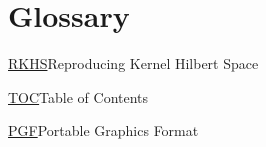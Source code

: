 
\section*{Glossary}\label{glossary}

\thispagestyle{empty}
\sffamily

\def\mylhypertarget{rkhsgloss}
\newcommand{\RKHS}{\hyperlink{\mylhypertarget}{RKHS}}
\newcommand{\RKHSlong}{Reproducing Kernel Hilbert Space}
{\RKHS \tab \hypertarget{\mylhypertarget}{\RKHSlong} \par}

\def\mylhypertarget{tocgloss}
\newcommand{\mytoc}{\hyperlink{\mylhypertarget}{TOC}}
\newcommand{\mytoclong}{Table of Contents}
{\mytoc \tab \hypertarget{\mylhypertarget}{\mytoclong} \par}

\def\mylhypertarget{pgfgloss}
\newcommand{\mypgf}{\hyperlink{\mylhypertarget}{PGF}}
\newcommand{\mypgflong}{Portable Graphics Format}
{\mypgf \tab \hypertarget{\mylhypertarget}{\mypgflong} \par}





\normalfont
\cleardoublepage